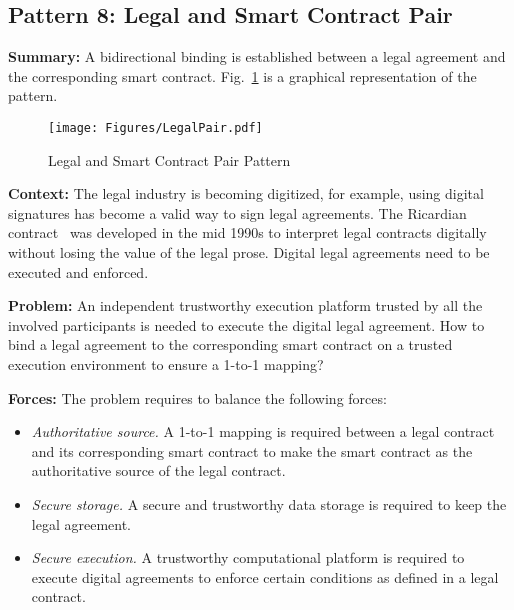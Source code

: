 
\subsection{ \textbf{Pattern 8: Legal and Smart Contract Pair}}
\label{sec:legal}

\noindent \textbf{Summary:} A bidirectional binding is established between a legal agreement and the corresponding smart contract. Fig.~\ref{fig:legal} is a graphical representation of the pattern.

\begin{figure}[t]
\begin{center}
\texttt{[image: Figures/LegalPair.pdf]}
\caption{Legal and Smart Contract Pair Pattern}\label{fig:legal}
\end{center}
\end{figure}

\vspace{0.5em}\noindent \textbf{Context:} 
The legal industry is becoming digitized, for example, using digital signatures has become a valid way to sign legal agreements. The Ricardian contract~\cite{Ricardian} was developed in the mid 1990s to interpret legal contracts digitally without losing the value of the legal prose. Digital legal agreements need to be executed and enforced.

\vspace{0.5em}\noindent \textbf{Problem:} 
An independent trustworthy execution platform trusted by all the involved participants is needed to execute the digital legal agreement. How to bind a legal agreement to the corresponding smart contract on a trusted execution environment to ensure a 1-to-1 mapping?


\vspace{0.5em}\noindent \textbf{Forces:} The problem requires to balance the following forces:
\begin{itemize}
  \item \textit{Authoritative source.} A 1-to-1 mapping is required between a legal contract and its corresponding smart contract to make the smart contract as the authoritative source of the legal contract.
  \item \textit{Secure storage.} A secure and trustworthy data storage is required to keep the legal agreement.
  \item \textit{Secure execution.} A trustworthy computational platform is required to execute digital agreements to enforce certain conditions as defined in a legal contract. 
\end{itemize}

